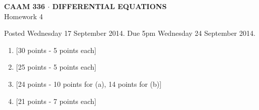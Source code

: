 \documentclass[10pt]{article}
\begin{document}
\vspace*{-5em}
\begin{center}
\large \textsf{\textbf{CAAM 336 $\cdot$ DIFFERENTIAL EQUATIONS}\\[0.5em]
Homework 4 }
\end{center}

Posted Wednesday 17 September 2014. Due 5pm Wednesday 24 September 2014.

\begin{enumerate}
\item {[30 points - 5 points each]}\\   
\vspace{1cm}
\item {[25 points - 5 points each]}\\  
\newpage
\item {[24 points - 10 points for (a), 14 points for (b)]}\\  
\vspace{1em}
\item {[21 points - 7 points each]}\\  
\end{enumerate}
\end{document}
